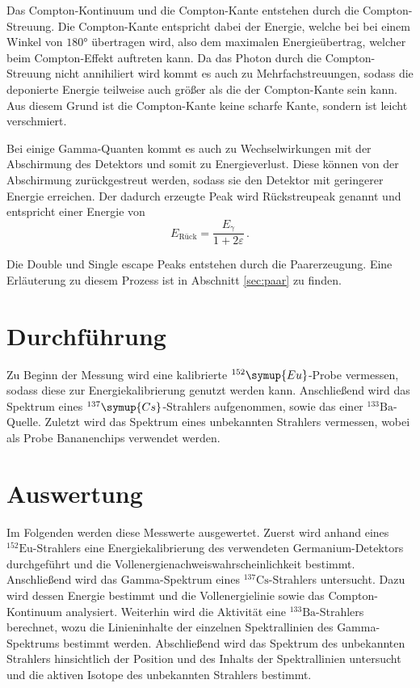 Das Compton-Kontinuum und die Compton-Kante entstehen durch die Compton-Streuung.
Die Compton-Kante entspricht dabei der Energie, welche bei bei einem Winkel von $180°$ übertragen wird, also dem maximalen Energieübertrag, welcher beim Compton-Effekt auftreten kann.
Da das Photon durch die Compton-Streuung nicht annihiliert wird kommt es auch zu Mehrfachstreuungen, sodass die deponierte Energie teilweise auch größer als die der Compton-Kante sein kann.
Aus diesem Grund ist die Compton-Kante keine scharfe Kante, sondern ist leicht verschmiert.

Bei einige Gamma-Quanten kommt es auch zu Wechselwirkungen mit der Abschirmung des Detektors und somit zu Energieverlust.
Diese können von der Abschirmung zurückgestreut werden, sodass sie den Detektor mit geringerer Energie erreichen.
Der dadurch erzeugte Peak wird Rückstreupeak genannt und entspricht einer Energie von
\begin{equation}
    \label{eq:ruckstreu}
E_\text{Rück}= \frac{E_{\gamma}}{1+2\varepsilon}\, .
\end{equation}

Die Double und Single escape Peaks entstehen durch die Paarerzeugung.
Eine Erläuterung zu diesem Prozess ist in Abschnitt \ref{sec:paar} zu finden. 

\section{Durchführung}
Zu Beginn der Messung wird eine kalibrierte $^{152}\symup{Eu}$-Probe vermessen, sodass diese zur Energiekalibrierung genutzt werden kann.
Anschließend wird das Spektrum eines $^{137}\symup{Cs}$-Strahlers aufgenommen, sowie das einer $^{133}\text{Ba}$-Quelle.
Zuletzt wird das Spektrum eines unbekannten Strahlers vermessen, wobei als Probe Bananenchips verwendet werden.

\section{Auswertung}
Im Folgenden werden diese Messwerte ausgewertet. Zuerst wird anhand eines $^{152}\text{Eu}$-Strahlers eine Energiekalibrierung
des verwendeten Germanium-Detektors durchgeführt und die Vollenergienachweiswahrscheinlichkeit bestimmt.
Anschließend wird das Gamma-Spektrum eines $^{137}\text{Cs}$-Strahlers untersucht. Dazu wird dessen Energie bestimmt und die 
Vollenergielinie sowie das Compton-Kontinuum analysiert. 
Weiterhin wird die Aktivität eine $^{133}\text{Ba}$-Strahlers berechnet, wozu die Linieninhalte der einzelnen Spektrallinien 
des Gamma-Spektrums bestimmt werden. 
Abschließend wird das Spektrum des unbekannten Strahlers hinsichtlich der Position und des Inhalts der Spektrallinien untersucht
und die aktiven Isotope des unbekannten Strahlers bestimmt.
